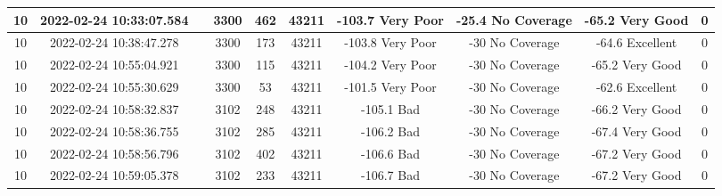 \begin{longtable*}{|c|c|c|c|c|c|c|c|c|c|}
10&2022-02-24 10:33:07.584&&3300&462&43211& -103.7    Very Poor   & -25.4     No Coverage & -65.2     Very Good   & 0\\\hline
{}10&2022-02-24 10:38:47.278&&3300&173&43211& -103.8    Very Poor   & -30       No Coverage & -64.6     Excellent   & 0\\\hline
{}10&2022-02-24 10:55:04.921&&3300&115&43211& -104.2    Very Poor   & -30       No Coverage & -65.2     Very Good   & 0\\\hline
{}10&2022-02-24 10:55:30.629&&3300&53&43211& -101.5    Very Poor   & -30       No Coverage & -62.6     Excellent   & 0\\\hline
{}10&2022-02-24 10:58:32.837&&3102&248&43211& -105.1    Bad         & -30       No Coverage & -66.2     Very Good   & 0\\\hline
{}10&2022-02-24 10:58:36.755&&3102&285&43211& -106.2    Bad         & -30       No Coverage & -67.4     Very Good   & 0\\\hline
{}10&2022-02-24 10:58:56.796&&3102&402&43211& -106.6    Bad         & -30       No Coverage & -67.2     Very Good   & 0\\\hline
{}10&2022-02-24 10:59:05.378&&3102&233&43211& -106.7    Bad         & -30       No Coverage & -67.2     Very Good   & 0\\\hline

\end{longtable*}
